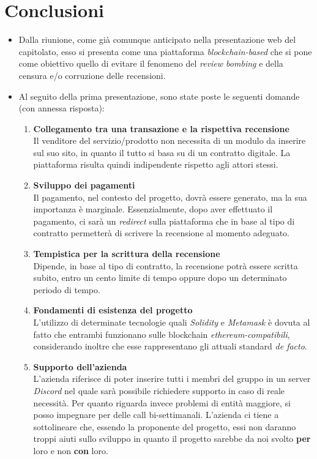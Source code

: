 \documentclass[a4paper, 12pt]{article}
\begin{document}
\section*{Conclusioni}
\begin{itemize}
    \item Dalla riunione, come già comunque anticipato nella presentazione web del capitolato, esso si presenta come una piattaforma \textit{blockchain-based} che si pone come obiettivo quello di evitare il fenomeno del \textit{review bombing} e della censura e/o corruzione delle recensioni.
    \item Al seguito della prima presentazione, sono state poste le seguenti domande (con annessa risposta):
    \begin{enumerate}
        \item \textbf{Collegamento tra una transazione e la rispettiva recensione} \\ Il venditore del servizio/prodotto non necessita di un modulo da inserire sul suo sito, in quanto il tutto si basa su di un contratto digitale. La piattaforma risulta quindi indipendente rispetto agli attori stessi.
        \item \textbf{Sviluppo dei pagamenti} \\ Il pagamento, nel contesto del progetto, dovrà essere generato, ma la sua importanza è marginale. Essenzialmente, dopo aver effettuato il pagamento, ci sarà un \textit{redirect} sulla piattaforma che in base al tipo di contratto permetterà di scrivere la recensione al momento adeguato.
        \item \textbf{Tempistica per la scrittura della recensione} \\ Dipende, in base al tipo di contratto, la recensione potrà essere scritta subito, entro un cento limite di tempo oppure dopo un determinato periodo di tempo.
        \item \textbf{Fondamenti di esistenza del progetto} \\ L'utilizzo di determinate tecnologie quali \textit{Solidity} e \textit{Metamask} è dovuta al fatto che entrambi funzionano sulle blockchain \textit{ethereum-compatibili}, considerando inoltre che esse rappresentano gli attuali standard \textit{de facto}.
        \item \textbf{Supporto dell'azienda} \\ L'azienda riferisce di poter inserire tutti i membri del gruppo in un server \textit{Discord} nel quale sarà possibile richiedere supporto in caso di reale necessità. Per quanto riguarda invece problemi di entità maggiore, si posso impegnare per delle call bi-settimanali. L'azienda ci tiene a sottolineare che, essendo la proponente del progetto, essi non daranno troppi aiuti sullo sviluppo in quanto il progetto sarebbe da noi svolto \textbf{per} loro e non \textbf{con} loro.

\end{enumerate}
\end{itemize}
\end{document}
